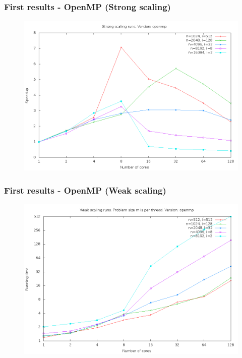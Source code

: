 \documentclass{beamer}
\begin{document}
\begin{frame}
\frametitle{First results - OpenMP (Strong scaling)}
\begin{figure}
\includegraphics[width=\textwidth]{gfx/padding_strong_scaling_openmp_speedup}
\end{figure}
\end{frame}

\begin{frame}
\frametitle{First results - OpenMP (Weak scaling)}
\begin{figure}
\includegraphics[width=\textwidth]{gfx/padding_weak_scaling_openmp_runningtime}
\end{figure}
\end{frame}
\end{document}
